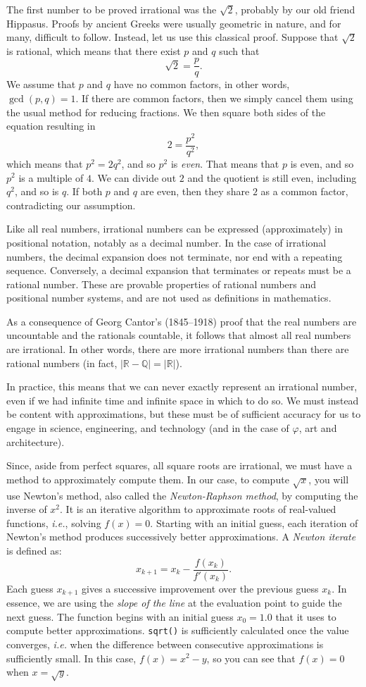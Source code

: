 The first number to be proved irrational was the $\sqrt{2}$, probably by
our old friend Hippasus. Proofs by ancient Greeks were usually geometric
in nature, and for many, difficult to follow. Instead, let us use this
classical proof.  Suppose that $\sqrt{2}$ is rational, which means that
there exist $p$ and $q$ such that $$\sqrt{2} = \frac{p}{q}.$$ We assume
that $p$ and $q$ have no common factors, in other words, $\gcd(p,q) =1
$. If there are common factors, then we simply cancel them using the
usual method for reducing fractions. We then square both sides of the
equation resulting in $$2 = \frac{p^2}{q^2},$$ which means that $p^2 = 2
q^2$, and so $p^2$ is \emph{even}. That means that $p$ is even, and so
$p^2$ is a multiple of $4$. We can divide out $2$ and the quotient is
still even, including $q^2$, and so is $q$. If both $p$ and $q$ are
even, then they share $2$ as a common factor, contradicting our
assumption.

Like all real numbers, irrational numbers can be expressed (approximately) in positional
notation, notably as a decimal number. In the case of irrational
numbers, the decimal expansion does not terminate, nor end with a
repeating sequence. Conversely, a decimal expansion that terminates or
repeats must be a rational number. These are provable properties of
rational numbers and positional number systems, and are not used as
definitions in mathematics.

As a consequence of Georg Cantor's (1845--1918) proof that the real
numbers are uncountable and the rationals countable, it follows that
almost all real numbers are irrational. In other words, there are more
irrational numbers than there are rational numbers (in fact,
$|\mathbb{R}-\mathbb{Q}| = |\mathbb{R}|$).

In practice, this means that we can never exactly represent an
irrational number, even if we had infinite time and infinite space in
which to do so. We must instead be content with approximations, but
these must be of sufficient accuracy for us to engage in science,
engineering, and technology (and in the case of $\varphi$, art and
architecture).

Since, aside from perfect squares, all square roots are irrational, we
must have a method to approximately compute them. In our case, to
compute $\sqrt{x}$, you will use Newton's method, also called the
\emph{Newton-Raphson method}, by computing the inverse of $x^2$. It is
an iterative algorithm to approximate roots of real-valued functions,
\emph{i.e.}\xspace, solving $f(x) = 0$. Starting with an initial guess,
each iteration of Newton's method produces successively better
approximations. A \emph{Newton iterate} is defined as:
$$
x_{k+1} = x_k - \frac{f(x_k)}{f'(x_k)} .
$$
Each guess $x_{k+1}$ gives a successive improvement over the previous
guess $x_k$. In essence, we are using the \emph{slope of the line} at
the evaluation point to guide the next guess.  The function begins with
an initial guess $x_0 = 1.0$ that it uses to compute better
approximations. \texttt{sqrt()} is sufficiently calculated once the
value converges, \emph{i.e.}\xspace when the difference between
consecutive approximations is sufficiently small. In this case, $f(x) =
x^2 - y$, so you can see that $f(x)=0$ when $x = \sqrt{y}$.

